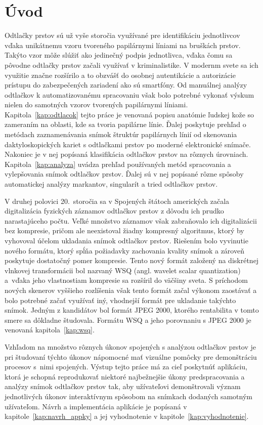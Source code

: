 \chapter{Úvod}
  Odtlačky prstov sú už vyše storočia využívané pre identifikáciu jednotlivcov vďaka unikátnemu vzoru tvoreného papilárnymi líniami na bruškách prstov.
  Takýto vzor môže slúžiť ako jedinečný podpis jednotlivca, vďaka čomu sa pôvodne odtlačky prstov začali využívať v kriminalistike. V modernm svete sa ich
  využitie značne rozšírilo a to obzvášť do osobnej autentikácie a autorizácie prístupu do zabezpečených zariadení ako sú smartfóny. Od manuálnej analýzy
  odtlačkov k automatizovanému spracovaniu však bolo potrebné vykonať výskum nielen do samotných vzorov tvorených papilárnymi líniami.
  Kapitola~{\ref{kap:odtlacok}} tejto práce je venovaná popisu anatómie ľudskej
  kože so zameraním na oblasti, kde sa tvoria papilárne línie. Ďalej poskytuje prehľad o metódach zaznamenávania snímok štruktúr papilárnych línií od
  skenovania daktyloskopických kariet s odtlačkami prstov po moderné elektronické snímače. Nakoniec je v nej popísaná klasifikácia odtlačkov prstov na rôznych
  úrovniach. Kapitola~{\ref{kap:analyza}} uvádza prehľad používaných metód spracovania a vylepšovania snímok odtlačkov prstov. Ďalej sú v nej popísané rôzne
  spôsoby automatickej analýzy markantov, singularít a tried odtlačkov prstov.

  V druhej polovici 20.~storočia sa v Spojených štátoch amerických začala digitalizácia fyzických záznamov odtlačkov prstov z dôvodu ich prudko narastajúceho
  počtu. Veľké množstvo záznamov však zabraňovalo ich digitalizácii bez kompresie, pričom ale neexistoval žiadny kompresný algoritmus, ktorý by vyhovoval
  účelom ukladania snímok odtlačkov prstov. Riešením bolo vyvinutie nového formátu, ktorý spĺňa požiadavky zachovania kvality snímok a zároveň poskytuje
  dostatočný pomer kompresie. Tento nový formát založený na diskrétnej vlnkovej transformácii bol nazvaný WSQ (angl. wavelet scalar quantization) a~vďaka
  jeho vlastnostiam kompresie sa rozšíril do väčšiny sveta. S príchodom nových skenerov vyššieho rozlíšenia však tento formát začal výkonom zaostávať a
  bolo potrebné začať využívať iný, vhodnejší formát pre ukladanie takýchto snímok. Jedným z kandidátov bol formát JPEG 2000, ktorého rentabilita v tomto smere
  sa dôkladne študovala. Formátu WSQ a jeho porovnaniu s JPEG 2000 je venovaná kapitola~{\ref{kap:wsq}}.

  Vzhľadom na množstvo rôznych úkonov spojených s analýzou odtlačkov prstov je pri študovaní týchto úkonov nápomocné mať vizuálne pomôcky
  pre demonštráciu procesov s~nimi spojených. Výstup tejto práce má za cieľ poskytnúť aplikáciu, ktorá je schopná reprodukovať
  niektoré najbežnejšie úkony predspracovania a analýzy snímok odtlačkov prstov tak, aby užívateľovi demonštrovali význam jednotlivých úkonov
  interaktívnym spôsobom na snímkach dodaných samotným užívateľom. Návrh a implementácia aplikácie je popísaná v kapitole~{\ref{kap:navrh_appky}}
  a jej vyhodnotenie v kapitole~{\ref{kap:vyhodnotenie}}.

